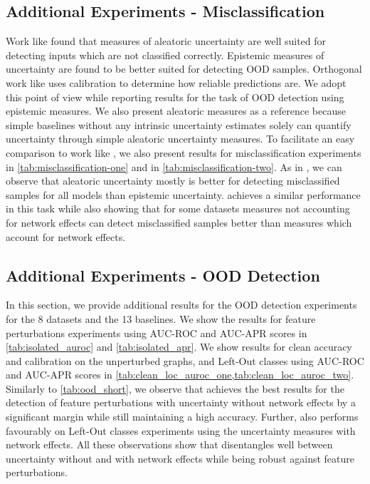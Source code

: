 \subsection{Additional Experiments - Misclassification}
\label{sec:add-exp-misclassification}

Work like \citep{Zhao2020} found that measures of aleatoric uncertainty are well suited for detecting inputs which are not classified correctly. Epistemic measures of uncertainty are found to be better suited for detecting OOD samples. Orthogonal work like \citep{calibration-network, dataset-shift} uses calibration to determine how reliable predictions are. We adopt this point of view while reporting results for the task of OOD detection using epistemic measures. We also present aleatoric measures as a reference because simple baselines without any intrinsic uncertainty estimates solely can quantify uncertainty through simple aleatoric uncertainty measures. To facilitate an easy comparison to work like \citep{Zhao2020}, we also present results for misclassification experiments in \cref{tab:misclassification-one} and in \cref{tab:misclassification-two}. As in \citep{Zhan2020}, we can observe that aleatoric uncertainty mostly is better for detecting misclassified samples for all models than epistemic uncertainty. \GPNacro{} achieves a similar performance in this task while also showing that for some datasets measures not accounting for network effects can detect misclassified samples better than measures which account for network effects. 



\subsection{Additional Experiments - OOD Detection}

In this section, we provide additional results for the OOD detection experiments for the 8 datasets and the 13 baselines. We show the results for feature perturbations experiments using AUC-ROC and AUC-APR scores in \cref{tab:isolated_auroc} and \cref{tab:isolated_apr}. We show results for clean accuracy and calibration on the unperturbed graphs, and Left-Out classes using AUC-ROC and AUC-APR scores in \cref{tab:clean_loc_auroc_one,tab:clean_loc_auroc_two}. Similarly to \cref{tab:ood_short}, we observe that \GPNacro{} achieves the best results for the detection of feature perturbations with uncertainty without network effects by a significant margin while still maintaining a high accuracy. Further, \GPNacro{} also performs favourably on Left-Out classes experiments using the uncertainty measures with network effects. All these observations show that \GPNacro{} disentangles well between uncertainty without and with network effects while being robust against feature perturbations.



